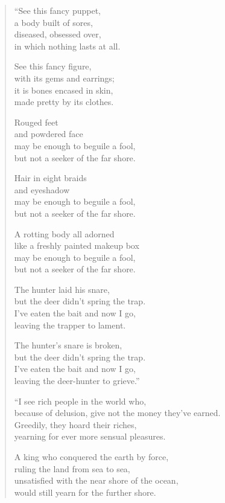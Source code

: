\documentclass[12pt,openany]{book}%
\begin{document}
\begin{verse}%
“See this fancy puppet, \\
a body built of sores, \\
diseased, obsessed over, \\
in which nothing lasts at all. 

See this fancy figure, \\
with its gems and earrings; \\
it is bones encased in skin, \\
made pretty by its clothes. 

Rouged feet \\
and powdered face \\
may be enough to beguile a fool, \\
but not a seeker of the far shore. 

Hair in eight braids \\
and eyeshadow \\
may be enough to beguile a fool, \\
but not a seeker of the far shore. 

A rotting body all adorned \\
like a freshly painted makeup box \\
may be enough to beguile a fool, \\
but not a seeker of the far shore. 

The hunter laid his snare, \\
but the deer didn’t spring the trap. \\
I’ve eaten the bait and now I go, \\
leaving the trapper to lament. 

The hunter’s snare is broken, \\
but the deer didn’t spring the trap. \\
I’ve eaten the bait and now I go, \\
leaving the deer-hunter to grieve.” 

“I see rich people in the world who, \\
because of delusion, give not the money they’ve earned. \\
Greedily, they hoard their riches, \\
yearning for ever more sensual pleasures. 

A king who conquered the earth by force, \\
ruling the land from sea to sea, \\
unsatisfied with the near shore of the ocean, \\
would still yearn for the further shore. 


\end{verse}
\end{document}
